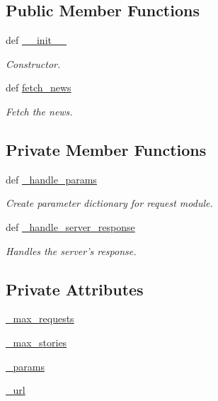 \subsection*{Public Member Functions}
\begin{DoxyCompactItemize}
\item 
def \hyperlink{classrapp__news__explorer_1_1google__news__engine_1_1GoogleNewsEngine_a825c7342362312c1179e3c99f90c64fb}{\-\_\-\-\_\-init\-\_\-\-\_\-}
\begin{DoxyCompactList}\small\item\em Constructor. \end{DoxyCompactList}\item 
def \hyperlink{classrapp__news__explorer_1_1google__news__engine_1_1GoogleNewsEngine_a6e547e18334130cc956f1b10c0b174bf}{fetch\-\_\-news}
\begin{DoxyCompactList}\small\item\em Fetch the news. \end{DoxyCompactList}\end{DoxyCompactItemize}
\subsection*{Private Member Functions}
\begin{DoxyCompactItemize}
\item 
def \hyperlink{classrapp__news__explorer_1_1google__news__engine_1_1GoogleNewsEngine_abb6ffe4b36a2cd4a3f027cf897f5d2e4}{\-\_\-handle\-\_\-params}
\begin{DoxyCompactList}\small\item\em Create parameter dictionary for request module. \end{DoxyCompactList}\item 
def \hyperlink{classrapp__news__explorer_1_1google__news__engine_1_1GoogleNewsEngine_a760e72ce227e3b625999c05e33574fac}{\-\_\-handle\-\_\-server\-\_\-response}
\begin{DoxyCompactList}\small\item\em Handles the server's response. \end{DoxyCompactList}\end{DoxyCompactItemize}
\subsection*{Private Attributes}
\begin{DoxyCompactItemize}
\item 
\hyperlink{classrapp__news__explorer_1_1google__news__engine_1_1GoogleNewsEngine_a386770c66afcffc956eb9bd066040689}{\-\_\-max\-\_\-requests}
\item 
\hyperlink{classrapp__news__explorer_1_1google__news__engine_1_1GoogleNewsEngine_a000e017d65d9d2a7d449e36ec291b467}{\-\_\-max\-\_\-stories}
\item 
\hyperlink{classrapp__news__explorer_1_1google__news__engine_1_1GoogleNewsEngine_abd84637f7fc0ed6007ab36edcc3a8fc0}{\-\_\-params}
\item 
\hyperlink{classrapp__news__explorer_1_1google__news__engine_1_1GoogleNewsEngine_a0ea605dfe67b44d3549af099a881d23b}{\-\_\-url}
\end{DoxyCompactItemize}
